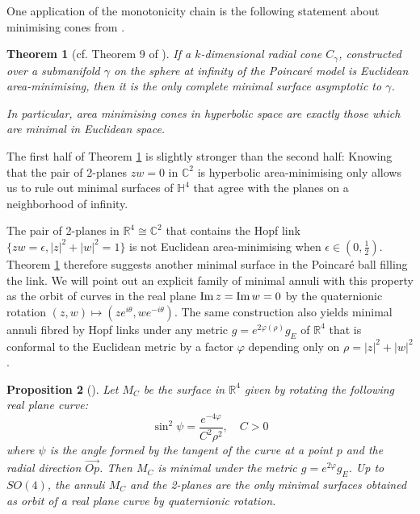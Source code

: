 \documentclass[11pt]{article}
\newtheorem{theorem}{Theorem}
\newtheorem{proposition}[theorem]{Proposition}
\newcommand{\im}{\mathop{\rm Im}\nolimits}
\begin{document}
One application of the monotonicity chain is the following statement about minimising cones
from \cite{Anderson82_CompleteMinimalVarieties}.

\begin{theorem}[cf. Theorem 9 of \cite{Anderson82_CompleteMinimalVarieties}]
\label{thm:minimising-cone}
If a \(k\)-dimensional radial cone \(C_\gamma\), constructed over a submanifold \(\gamma\) on the sphere at infinity of the Poincaré model is Euclidean area-minimising,
then it is the only complete minimal surface asymptotic to \(\gamma\).

In particular, area minimising cones in hyperbolic space are exactly those which are minimal in Euclidean space.
\end{theorem}

The first half of Theorem \ref{thm:minimising-cone} is slightly stronger than the second
half: Knowing that the pair of 2-planes \(zw =
0\) in \(\mathbb{C}^2\) is hyperbolic area-minimising only allows us to rule out minimal surfaces of \(\mathbb{H}^4\) 
that agree with the planes on a neighborhood of infinity.

The pair of 2-planes in \(\mathbb{R}^4\cong
\mathbb{C}^2\) that contains the Hopf link \(\{zw=\epsilon, |z|^2 + |w|^2 = 1\}\) is
not Euclidean area-minimising when \(\epsilon\in(0, \frac{1}{2})\). Theorem
\ref{thm:minimising-cone} therefore suggests another minimal
surface in the Poincaré ball filling the link. 
We will point out an explicit family of minimal annuli with this
property as the orbit of curves in the real plane \(\im z = \im w = 0\) by the quaternionic rotation \((z,w)\mapsto (ze^{i\theta},
w e^{-i\theta})\). 
The same construction also yields minimal annuli fibred by Hopf links under any metric  \(g =
e^{2\varphi(\rho)}g_E\) of \(\mathbb{R}^4\) that is conformal to the Euclidean metric by a factor \(\varphi\) depending only on \(\rho = |z|^2 +|w|^2\).

\begin{proposition}[]
\label{prop:min-annuli}
Let \(M_{C}\) be the surface in \(\mathbb{R}^4\) given by rotating the following real plane curve:
\begin{equation}
\label{eq:min-annuli}
\sin^2\psi = \frac{e^{-4\varphi}}{C^2\rho^2}, \quad C > 0
\end{equation}
where \(\psi\) is the angle formed by the tangent of the curve at a point \(p\) and the
radial direction \(\overrightarrow{Op}\). Then \(M_{C}\) is
minimal under the metric \(g =
e^{2\varphi}g_E\). Up to \(SO(4)\), the annuli \(M_{C}\) and the 2-planes are the only
minimal surfaces obtained as orbit of a real plane curve by quaternionic rotation.
\end{proposition}
\end{document}
